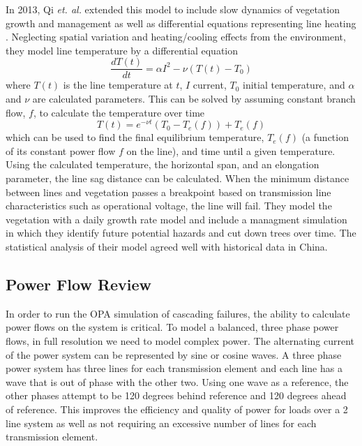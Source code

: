 In 2013, Qi {\it et. al.} extended this model to include slow dynamics of vegetation growth and management as well as differential equations representing line heating \cite{qi_2013}.  Neglecting spatial variation and heating/cooling effects from   the environment, they model line temperature by a differential equation
\begin{equation}
\frac{dT(t)}{dt} = \alpha I^2 - \nu (T(t) - T_0)
\end{equation}
where $T(t)$ is the line temperature at $t$, $I$ current, $T_0$ initial temperature, and $\alpha$ and $\nu$ are calculated parameters.  This can be solved by assuming constant branch flow, $f$, to calculate the temperature over time
\begin{equation}
T(t) = e^{-\nu t}\left( T_0 - T_e(f) \right) + T_e(f)
\end{equation}
which can be used to find the final equilibrium temperature, $T_e(f)$ (a function of its constant power flow $f$ on the line), and time until a given temperature.  Using the calculated temperature, the horizontal span, and an elongation parameter, the line sag distance can be calculated.  When the minimum distance between lines and vegetation passes a breakpoint based on transmission line characteristics such as operational voltage, the line will fail.  They model the vegetation with a daily growth rate model and include a managment simulation in which they identify future potential hazards and cut down trees over time.  The statistical analysis of their model agreed well with historical data in China.


\subsection{Power Flow Review}
In order to run the OPA simulation of cascading failures, the ability to calculate power flows on the system is critical.  To model a balanced, three phase power flows, in full resolution we need to model complex power.  The alternating current of the power system can be represented by sine or cosine waves.  A three phase power system has three lines for each transmission element and each line has a wave that is out of phase with the other two.  Using one wave as a reference, the other phases attempt to be 120 degrees behind reference and 120 degrees ahead of reference.  This improves the efficiency and quality of power for loads over a 2 line system as well as not requiring an excessive number of lines for each transmission element.  

